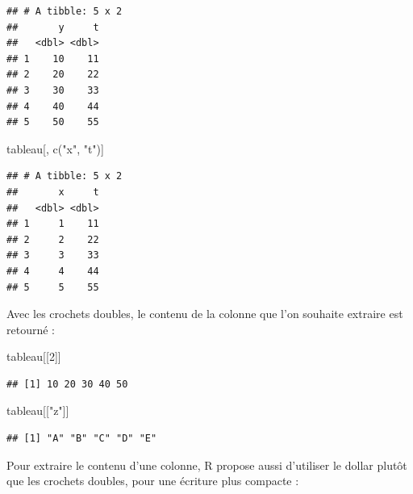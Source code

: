 \documentclass[
  11pt,
]{book}
\newenvironment{Shaded}{\begin{snugshade}}{\end{snugshade}}
\newcommand{\DecValTok}[1]{\textcolor[rgb]{0.00,0.00,0.81}{#1}}
\newcommand{\FunctionTok}[1]{\textcolor[rgb]{0.00,0.00,0.00}{#1}}
\newcommand{\NormalTok}[1]{#1}
\newcommand{\SpecialCharTok}[1]{\textcolor[rgb]{0.00,0.00,0.00}{#1}}
\newcommand{\StringTok}[1]{\textcolor[rgb]{0.31,0.60,0.02}{#1}}
\numberwithin{equation}{section}
\numberwithin{countremarque}{section}
\begin{document}
\begin{lstlisting}
## # A tibble: 5 x 2
##       y     t
##   <dbl> <dbl>
## 1    10    11
## 2    20    22
## 3    30    33
## 4    40    44
## 5    50    55
\end{lstlisting}

\begin{Shaded}
\begin{Highlighting}[]
\NormalTok{tableau[, }\FunctionTok{c}\NormalTok{(}\StringTok{"x"}\NormalTok{, }\StringTok{"t"}\NormalTok{)]}
\end{Highlighting}
\end{Shaded}

\begin{lstlisting}
## # A tibble: 5 x 2
##       x     t
##   <dbl> <dbl>
## 1     1    11
## 2     2    22
## 3     3    33
## 4     4    44
## 5     5    55
\end{lstlisting}

Avec les crochets doubles, le contenu de la colonne que l'on souhaite extraire est retourné :

\begin{Shaded}
\begin{Highlighting}[]
\NormalTok{tableau[[}\DecValTok{2}\NormalTok{]]}
\end{Highlighting}
\end{Shaded}

\begin{lstlisting}
## [1] 10 20 30 40 50
\end{lstlisting}

\begin{Shaded}
\begin{Highlighting}[]
\NormalTok{tableau[[}\StringTok{"z"}\NormalTok{]]}
\end{Highlighting}
\end{Shaded}

\begin{lstlisting}
## [1] "A" "B" "C" "D" "E"
\end{lstlisting}

Pour extraire le contenu d'une colonne, R propose aussi d'utiliser le dollar plutôt que les crochets doubles, pour une écriture plus compacte :

\begin{Shaded}
\end{Shaded}
\end{document}
